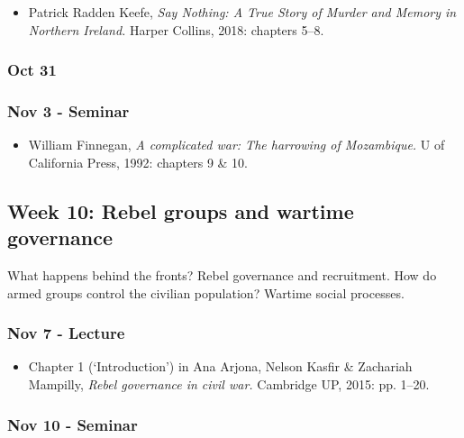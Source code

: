 \documentclass[12pt, a4paper]{article}
\begin{document}
\begin{itemize}
\setlength\itemsep{0pt}
\item Patrick Radden Keefe, \textit{Say Nothing: A True Story of Murder and Memory in Northern Ireland. }Harper Collins, 2018: chapters 5--8.
\end{itemize}

\subsubsection*{Oct 31 {}}

\subsubsection*{Nov 3 - Seminar}

\begin{itemize}
\setlength\itemsep{0pt}
\item William Finnegan, \textit{A complicated war: The harrowing of Mozambique.} U of California Press, 1992: chapters 9 \& 10.
\end{itemize}

\hline %

\subsection*{Week 10: Rebel groups and wartime governance}

What happens behind the fronts? Rebel governance and recruitment. How do armed groups control the civilian population? Wartime social processes.

\subsubsection*{Nov 7 - Lecture}

\begin{itemize}
\setlength\itemsep{0pt}
\item Chapter 1 (`Introduction') in Ana Arjona, Nelson Kasfir \& Zachariah Mampilly, \textit{Rebel governance in civil war.} Cambridge UP, 2015: pp. 1--20.
\end{itemize}

\subsubsection*{Nov 10 - Seminar}
\end{document}
